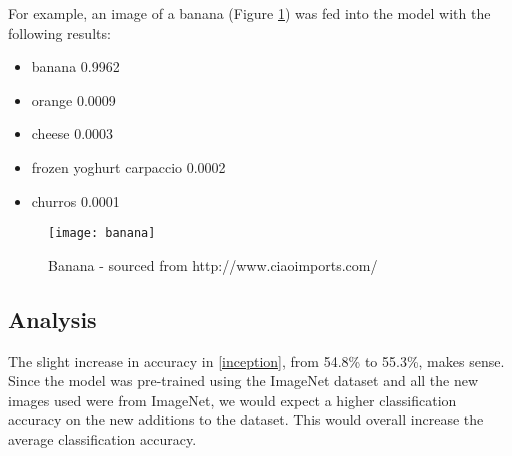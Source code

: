 For example, an image of a banana (Figure \ref{fig:banana}) was fed into the model with
the following results:
\begin{itemize}
    \item{banana 0.9962}
    \item{orange 0.0009}
    \item{cheese 0.0003}
    \item{frozen yoghurt carpaccio 0.0002}
    \item{churros 0.0001}
\end{itemize}
 
\begin{figure}
    \texttt{[image: banana]}
    \caption{Banana - sourced from http://www.ciaoimports.com/}
    \label{fig:banana}
\end{figure}

\subsection*{Analysis}
The slight increase in accuracy in \ref{inception}, from 54.8\% to 55.3\%, makes
sense. Since the model was pre-trained using the ImageNet dataset and all the
new images used were from ImageNet, we would expect a higher classification
accuracy on the new additions to the dataset. This would overall increase the
average classification accuracy.
